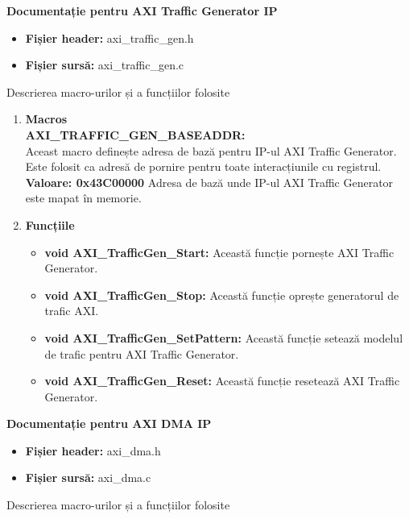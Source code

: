 \documentclass[12pt]{article}
\begin{document}
\textbf{Documentație pentru AXI Traffic Generator IP}
 \begin{itemize}
    \item \textbf{Fișier header:} axi\_traffic\_gen.h
    \item \textbf{Fișier sursă:} axi\_traffic\_gen.c\\
 \end{itemize}
\hspace*{1cm}Descrierea macro-urilor și a funcțiilor folosite
\begin{enumerate}
    \item \textbf{Macros}\\
    \hspace*{1cm} \textbf{AXI\_TRAFFIC\_GEN\_BASEADDR:} \\
    \hspace*{1cm} Aceast macro definește adresa de bază pentru IP-ul AXI Traffic Generator. Este folosit ca adresă de pornire pentru toate interacțiunile cu registrul.\\
    \hspace*{1cm} \textbf{Valoare: 0x43C00000} Adresa de bază unde IP-ul AXI Traffic Generator este mapat în memorie.
    \item \textbf{Funcțiile}
        \begin{itemize}
            \item \textbf{void AXI\_TrafficGen\_Start:} Această funcție pornește AXI Traffic Generator.
            \item \textbf{void AXI\_TrafficGen\_Stop:} Această funcție oprește generatorul de trafic AXI.
            \item \textbf{void AXI\_TrafficGen\_SetPattern:} Această funcție setează modelul de trafic pentru AXI Traffic Generator.
            \item \textbf{void AXI\_TrafficGen\_Reset:} Această funcție resetează AXI Traffic Generator.\\
        \end{itemize}
\end{enumerate}
\textbf{Documentație pentru AXI DMA IP}
 \begin{itemize}
    \item \textbf{Fișier header:} axi\_dma.h
    \item \textbf{Fișier sursă:} axi\_dma.c\\
 \end{itemize}
\hspace*{1cm}Descrierea macro-urilor și a funcțiilor folosite
\end{document}
